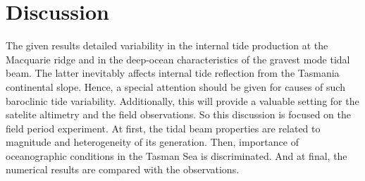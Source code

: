 \documentclass[12pt]{article}
\begin{document}
\newpage
\section{Discussion}
The given results detailed variability in the internal tide production at the Macquarie ridge 
and in the deep-ocean characteristics of the gravest mode tidal beam. The latter inevitably 
affects internal tide reflection from the Tasmania continental slope. Hence, a special attention 
should be given for causes of such baroclinic tide variability. Additionally, this will provide a 
valuable setting for the satelite altimetry and the field observations. So this discussion is 
focused on the field period experiment. At first, the tidal beam properties are related to 
magnitude and heterogeneity of its generation. Then, importance of oceanographic conditions in the 
Tasman Sea is discriminated. And at final, the numerical results are compared with the observations.
\end{document}
